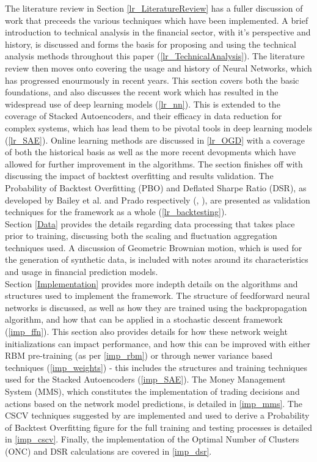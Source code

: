\documentclass[a4paper,11pt,oneside]{article}
\theoremstyle{plain}
\theoremstyle{definition}
\begin{document}
	The literature review in Section \ref{lr_LiteratureReview} has a fuller discussion of work that preceeds the various techniques which have been implemented. A brief introduction to technical analysis in the financial sector, with it's perspective and history, is discussed and forms the basis for proposing and using the technical analysis methods throughout this paper (\ref{lr_TechnicalAnalysis}). The literature review then moves onto covering the usage and history of Neural Networks, which has progressed enourmously in recent years. This section covers both the basic foundations, and also discusses the recent work which has resulted in the widespread use of deep learning models (\ref{lr_nn}). This is extended to the coverage of Stacked Autoencoders, and their efficacy in data reduction for complex systems, which has lead them to be pivotal tools in deep learning models (\ref{lr_SAE}). Online learning methods are discussed in \ref{lr_OGD} with a coverage of both the historical basis as well as the more recent devopments which have allowed for further improvement in the algorithms. The section finishes off with discussing the impact of backtest overfitting and results validation. 
	The Probability of Backtest Overfitting (PBO) and Deflated Sharpe Ratio (DSR), as developed by Bailey et al. and Prado respectively (\cite{BailyPBO}, \cite{PradoDSR}), are presented as validation techniques for the framework as a whole (\ref{lr_backtesting}).	
	~\\\newline
	Section \ref{Data} provides the details regarding data processing that takes place prior to training, discussing both the scaling and fluctuation aggregation techniques used. A discussion of Geometric Brownian motion, which is used for the generation of synthetic data, is included with notes around its characteristics and usage in financial prediction models.
	~\\\newline
		Section \ref{Implementation} provides more indepth details on the algorithms and structures used to implement the framework. The structure of feedforward neural networks is discussed, as well as how they are trained using the backpropagation algorithm, and how that can be applied in a stochastic descent framework (\ref{imp_ffn}). This section also provides details for how these network weight initializations can impact performance, and how this can be improved with either RBM pre-training (as per \ref{imp_rbm}) or through newer variance based techniques (\ref{imp_weights}) - this includes the structures and training techniques used for the Stacked Autoencoders (\ref{imp_SAE}). The Money Management System (MMS), which constitutes the implementation of trading decisions and actions based on the network model predictions, is detailed in \ref{imp_mms}. The CSCV techniques suggested by \cite{BailyPBO} are implemented and used to derive a Probability of Backtest Overfitting figure for the full training and testing processes is detailed in \ref{imp_cscv}. Finally, the implementation of the Optimal Number of Clusters (ONC) and DSR calculations are covered in \ref{imp_dsr}.
\end{document}
